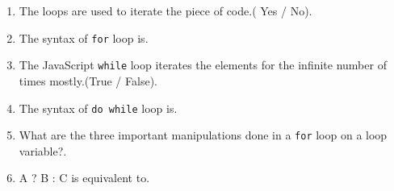 \documentclass[11pt,a4paper]{article}
\begin{document}
\begin{enumerate}
\item The loops are used to iterate the piece of code.( Yes / No)\underline{\hspace{3cm}}.
\item The syntax of \texttt{for} loop is\underline{\hspace{3cm}}.
\item The JavaScript \texttt{while} loop iterates the elements for the infinite number of times mostly.(True / False)\underline{\hspace{3cm}}.
\item The syntax of \texttt{do while} loop is\underline{\hspace{3cm}}.
\item What are the three important manipulations done in a \texttt{for} loop on a loop variable?\underline{\hspace{3cm}}.
\item A ? B : C is equivalent to\underline{\hspace{3cm}}.
\end{enumerate}
\end{document}
